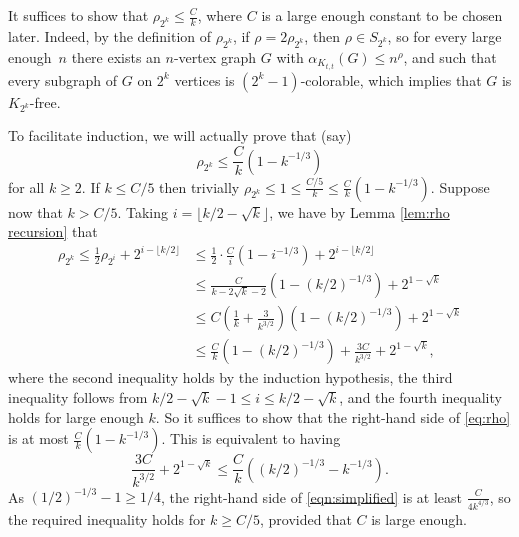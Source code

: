 \documentclass[11pt]{article}
\let\oldendproof\endproof
\renewenvironment{proof}[1][\proofname]{\oldproof[\bf #1]}{\oldendproof}
\theoremstyle{plain}
\theoremstyle{definition}
\begin{document}
\begin{proof}[Proof of Theorem \ref{thm:Ktt vs Kr construction}]
It suffices to show that $\rho_{2^k} \leq \frac{C}{k}$, where $C$ is a large enough constant to be chosen later. 
Indeed, by the definition of $\rho_{2^k}$, if $\rho=2\rho_{2^k}$, then $\rho\in S_{2^k}$, so for every large enough~$n$ there exists an $n$-vertex graph $G$ with $\alpha_{K_{t,t}}(G) \leq n^{\rho}$, and such that every subgraph of $G$ on $2^k$ vertices is $(2^k-1)$-colorable, which implies that $G$ is $K_{2^k}$-free. 

To facilitate induction, we will actually prove that (say) 
\begin{equation*}\label{eq:rho induction}
\rho_{2^k} \leq \frac{C}{k}\left( 1-k^{-1/3} \right)
\end{equation*}
for all $k \geq 2$.
If $k \leq C/5$ then trivially $\rho_{2^k} \leq 1 \leq 
\frac{C/5}{k} \leq \frac{C}{k}(1-k^{-1/3})$. Suppose now that $k > C/5$. Taking $i=\lfloor k/2-\sqrt{k} \rfloor$, we have by Lemma \ref{lem:rho recursion} that
\begin{align}\label{eq:rho}
\nonumber \rho_{2^k}\leq \frac{1}{2}\rho_{2^i}+2^{i-\lfloor k/2 \rfloor}
&\leq \frac{1}{2} \cdot \frac{C}{i}\left(1 - i^{-1/3}\right) + 2^{i-\lfloor k/2 \rfloor} \\ \nonumber &\leq 
\frac{C}{k - 2\sqrt{k} - 2} \left(1 - (k/2)^{-1/3}\right) + 2^{1-\sqrt{k}} \\ \nonumber &\leq 
C\left( \frac{1}{k} + \frac{3}{k^{3/2}} \right) \left(1-(k/2)^{-1/3}\right) + 2^{1-\sqrt{k}}
\\ &\leq 
\frac{C}{k}\left(1 - (k/2)^{-1/3}\right) + \frac{3C}{k^{3/2}} + 2^{1-\sqrt{k}}
,
\end{align}
where the second inequality holds by the induction hypothesis, the third inequality follows from $k/2 -\sqrt{k} - 1 \leq i \leq k/2 - \sqrt{k}$, and the fourth inequality holds for large enough $k$. So it suffices to show that the right-hand side of \eqref{eq:rho} is at most $\frac{C}{k}(1 - k^{-1/3})$. This is equivalent to having 
\begin{equation}
\frac{3C}{k^{3/2}} + 2^{1-\sqrt{k}} \leq 
\frac{C}{k} \left( (k/2)^{-1/3} - k^{-1/3} \right). \label{eqn:simplified}
\end{equation}
As $(1/2)^{-1/3} - 1 \geq 1/4$, the right-hand side of \eqref{eqn:simplified} is at least $\frac{C}{4k^{4/3}}$, so the required inequality holds for $k \geq C/5$, provided that $C$ is large enough. 
\end{proof}
\end{document}
